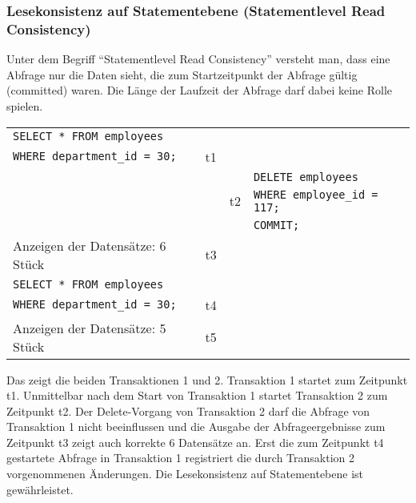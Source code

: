         \subsubsection{Lesekonsistenz auf Statementebene (Statementlevel Read Consistency)}
          \begin{merke}
            Unter dem Begriff \enquote{Statementlevel Read Consistency} versteht man, dass eine Abfrage nur die Daten sieht, die zum Startzeitpunkt der Abfrage g\"ultig (committed) waren. Die L\"ange der Laufzeit der Abfrage darf dabei keine Rolle spielen.
          \end{merke}
          \tabletail{}
          \begin{supertabular}{lr|ll}
            \label{statementlevelreadconsistency}
            \small{\texttt{SELECT * FROM employees}} & & & \\
            \small{\texttt{WHERE department\_id = 30;}} & \scriptsize{t1} & & \\
            & & & \small{\texttt{DELETE employees}} \\
            & & \scriptsize{t2} & \small{\texttt{WHERE employee\_id = 117;}}\\
            & & & \texttt{COMMIT;} \\
            \small{Anzeigen der Datens\"atze: 6 St\"uck} & \scriptsize{t3} & & \\
            \small{\texttt{SELECT * FROM employees}} & & & \\
            \small{\texttt{WHERE department\_id = 30;}} & \scriptsize{t4} & & \\
            \small{Anzeigen der Datens\"atze: 5 St\"uck} & \scriptsize{t5} & & \\
          \end{supertabular}

          Das  zeigt die beiden Transaktionen 1 und 2. Transaktion 1 startet zum Zeitpunkt t1. Unmittelbar nach dem Start von Transaktion 1 startet Transaktion 2 zum Zeitpunkt t2. Der Delete-Vorgang von Transaktion 2 darf die Abfrage von Transaktion 1 nicht beeinflussen und die Ausgabe der Abfrageergebnisse zum Zeitpunkt t3 zeigt auch korrekte 6 Datens\"atze an. Erst die zum Zeitpunkt t4 gestartete Abfrage in Transaktion 1 registriert die durch Transaktion 2 vorgenommenen \"Anderungen. Die Lesekonsistenz auf Statementebene ist gew\"ahrleistet.
